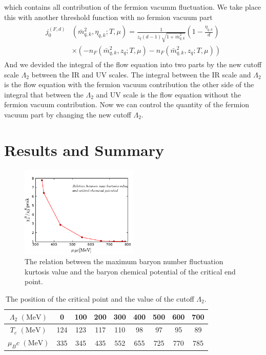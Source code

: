 \documentclass[%
reprint,
superscriptaddress,
showpacs,preprintnumbers,
 amsmath,amssymb,
 aps,
prl,
]{revtex4-1}
\begin{document}
which contains all contribution of the fermion vacumm fluctuation. We take place this with another threshold function with no fermion vacuum part 
\begin{align}
\begin{split}
j^{(F,d)}_{0}&(\bar{m}^2_{q,k},\eta_{q,k};T,\mu)=\frac{1}{z_q(d-1)\sqrt{1+\bar{m}^2_{q,k}}}(1-\frac{\eta_{q,k}}{d})\\
&\times(-n_F(\bar{m}^2_{q,k},z_q;T,\mu)-n_F(\bar{m}^2_{q,k},z_q;T,\mu))
\end{split}
\end{align}
And we devided the integral of the flow equation into two parts by the new cutoff scale $\Lambda_2$ between the IR and UV scales. The integral between the IR scale and $\Lambda_2$ is the flow equation with the fermion vacuum contribution the other side of the integral that between the $\Lambda_2$ and UV scale is the flow equation without the fermion vacuum contribution. Now we can control the quantity of the fermion vacuum part by changing the new cutoff $\Lambda_2$.
\section{Results and Summary}
\label{sec:res}
%
\begin{figure}[t]
\includegraphics[width=0.5\textwidth]{cp}
\caption{The relation between the maximum baryon number fluctuation kurtosis value and the baryon chemical potential of the critical end point. }\label{fig:cp}
\end{figure}
%
%
\begin{table}[tb!]
  \centering
  \begin{tabular}{c||c|c|c|c|c|c|c|c}
    $\Lambda_2\,\,(\mathrm{MeV})$ & 0 & 100 & 200 & 300 & 400 & 500 & 600 & 700 \rule{0pt}{2.6ex}\rule[-1.2ex]{0pt}{0pt}\\ \hline\hline
    $T_c\,\,(\mathrm{MeV})$ &124& 123 & 117 &110 &98&97&95&89 \\\hline
    $\mu_Bc\,\,(\mathrm{MeV})$ &335 &345 &435 &552&655&725&770&785\\\hline

  \end{tabular}
  \caption{The position of the critical point and the value of the cutoff $\Lambda_2$.} 
  \label{tab:cut}
\end{table}
%
\end{document}
